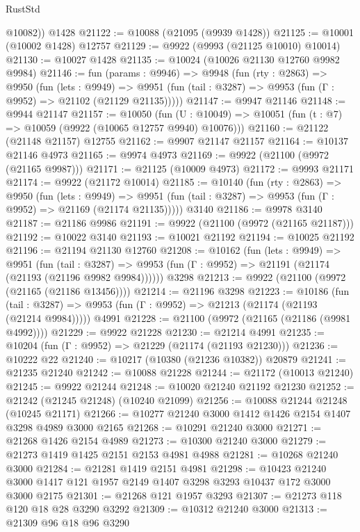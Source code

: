 \begin{lexlean}{RustStd}
\begin{coremodule}
        @10082))
    @1428
@21122 := @10088 (@21095 (@9939 @1428))
@21125 := @10001 (@10002 @1428) @12757
@21129 := @9922 (@9993 (@21125 @10010) @10014)
@21130 := @10027 @1428
@21135 := @10024 (@10026 @21130 @12760 @9982 @9984)
@21146 := fun (params : @9946) =>
  @9948
    (fun (rty : @2863) =>
    @9950
      (fun (lets : @9949) =>
      @9951 (fun (tail : @3287) => @9953 (fun (Γ : @9952) => @21102 (@21129 @21135)))))
@21147 := @9947 @21146
@21148 := @9944 @21147
@21157 := @10050
    (fun (U : @10049) => @10051 (fun (t : @7) => @10059 (@9922 (@10065 @12757 @9940) @10076)))
@21160 := @21122 (@21148 @21157) @12755
@21162 := @9907 @21147 @21157
@21164 := @10137 @21146 @4973
@21165 := @9974 @4973
@21169 := @9922 (@21100 (@9972 (@21165 @9987)))
@21171 := @21125 (@10009 @4973)
@21172 := @9993 @21171
@21174 := @9922 (@21172 @10014)
@21185 := @10140
    (fun (rty : @2863) =>
    @9950
      (fun (lets : @9949) =>
      @9951 (fun (tail : @3287) => @9953 (fun (Γ : @9952) => @21169 (@21174 @21135)))))
    @3140
@21186 := @9978 @3140
@21187 := @21186 @9986
@21191 := @9922 (@21100 (@9972 (@21165 @21187)))
@21192 := @10022 @3140
@21193 := @10021 @21192
@21194 := @10025 @21192
@21196 := @21194 @21130 @12760
@21208 := @10162
    (fun (lets : @9949) =>
    @9951
      (fun (tail : @3287) =>
      @9953 (fun (Γ : @9952) => @21191 (@21174 (@21193 (@21196 @9982 @9984))))))
    @3298
@21213 := @9922 (@21100 (@9972 (@21165 (@21186 @13456))))
@21214 := @21196 @3298
@21223 := @10186
    (fun (tail : @3287) => @9953 (fun (Γ : @9952) => @21213 (@21174 (@21193 (@21214 @9984)))))
    @4991
@21228 := @21100 (@9972 (@21165 (@21186 (@9981 @4992))))
@21229 := @9922 @21228
@21230 := @21214 @4991
@21235 := @10204 (fun (Γ : @9952) => @21229 (@21174 (@21193 @21230)))
@21236 := @10222 @22
@21240 := @10217 (@10380 (@21236 @10382)) @20879
@21241 := @21235 @21240
@21242 := @10088 @21228
@21244 := @21172 (@10013 @21240)
@21245 := @9922 @21244
@21248 := @10020 @21240 @21192 @21230
@21252 := @21242 (@21245 @21248) (@10240 @21099)
@21256 := @10088 @21244 @21248 (@10245 @21171)
@21266 := @10277 @21240 @3000 @1412 @1426 @2154 @1407 @3298 @4989 @3000 @2165
@21268 := @10291 @21240 @3000
@21271 := @21268 @1426 @2154 @4989
@21273 := @10300 @21240 @3000
@21279 := @21273 @1419 @1425 @2151 @2153 @4981 @4988
@21281 := @10268 @21240 @3000
@21284 := @21281 @1419 @2151 @4981
@21298 := @10423 @21240 @3000 @1417 @121 @1957 @2149 @1407 @3298 @3293 @10437 @172 @3000 @3000 @2175
@21301 := @21268 @121 @1957 @3293
@21307 := @21273 @118 @120 @18 @28 @3290 @3292
@21309 := @10312 @21240 @3000
@21313 := @21309 @96 @18 @96 @3290

\end{coremodule}
\end{lexlean}
